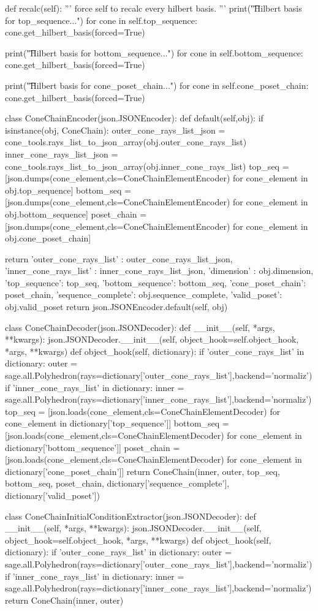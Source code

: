 \documentclass{TC}
\begin{document}
\begin{SAGE}
	def recalc(self):
		''' force self to recalc every hilbert basis. '''
		print("\t\tRecalculating Hilbert basis for top_sequence...")
		for cone in self.top_sequence:
			cone.get_hilbert_basis(forced=True)

		print("\t\tRecalculating Hilbert basis for bottom_sequence...")
		for cone in self.bottom_sequence:
			cone.get_hilbert_basis(forced=True)


		print("\t\tRecalculating Hilbert basis for cone_poset_chain...")
		for cone in self.cone_poset_chain:
			cone.get_hilbert_basis(forced=True)

		

class ConeChainEncoder(json.JSONEncoder):
	def default(self,obj):
		if isinstance(obj, ConeChain):
			outer_cone_rays_list_json = cone_tools.rays_list_to_json_array(obj.outer_cone_rays_list)
			inner_cone_rays_list_json = cone_tools.rays_list_to_json_array(obj.inner_cone_rays_list)
			top_seq = [json.dumps(cone_element,cls=ConeChainElementEncoder) for cone_element in obj.top_sequence]
			bottom_seq = [json.dumps(cone_element,cls=ConeChainElementEncoder) for cone_element in obj.bottom_sequence]
			poset_chain = [json.dumps(cone_element,cls=ConeChainElementEncoder) for cone_element in obj.cone_poset_chain]
			
			return {'outer_cone_rays_list' : outer_cone_rays_list_json,
				'inner_cone_rays_list' : inner_cone_rays_list_json,
				'dimension' : obj.dimension,
				'top_sequence': top_seq,
				'bottom_sequence': bottom_seq,
				'cone_poset_chain': poset_chain,
				'sequence_complete': obj.sequence_complete,
				'valid_poset': obj.valid_poset}
		return json.JSONEncoder.default(self, obj)

class ConeChainDecoder(json.JSONDecoder):
	def __init__(self, *args, **kwargs):
		json.JSONDecoder.__init__(self, object_hook=self.object_hook, *args, **kwargs)
	def object_hook(self, dictionary):
		if 'outer_cone_rays_list' in dictionary:
			outer = sage.all.Polyhedron(rays=dictionary['outer_cone_rays_list'],backend='normaliz')
		if 'inner_cone_rays_list' in dictionary:
			inner = sage.all.Polyhedron(rays=dictionary['inner_cone_rays_list'],backend='normaliz')
		top_seq = [json.loads(cone_element,cls=ConeChainElementDecoder) for cone_element in dictionary['top_sequence']]
		bottom_seq = [json.loads(cone_element,cls=ConeChainElementDecoder) for cone_element in dictionary['bottom_sequence']]
		poset_chain = [json.loads(cone_element,cls=ConeChainElementDecoder) for cone_element in dictionary['cone_poset_chain']]
		return ConeChain(inner, outer, top_seq, bottom_seq, poset_chain, dictionary['sequence_complete'], dictionary['valid_poset'])



class ConeChainInitialConditionExtractor(json.JSONDecoder):
	def __init__(self, *args, **kwargs):
		json.JSONDecoder.__init__(self, object_hook=self.object_hook, *args, **kwargs)
	def object_hook(self, dictionary):
		if 'outer_cone_rays_list' in dictionary:
			outer = sage.all.Polyhedron(rays=dictionary['outer_cone_rays_list'],backend='normaliz')
		if 'inner_cone_rays_list' in dictionary:
			inner = sage.all.Polyhedron(rays=dictionary['inner_cone_rays_list'],backend='normaliz')
		return ConeChain(inner, outer)

\end{SAGE}
\end{document}
